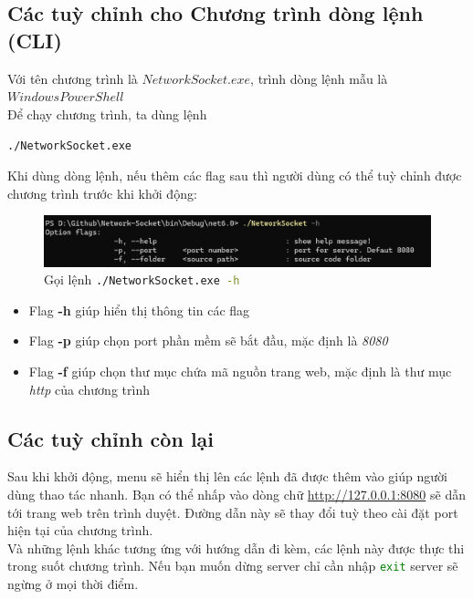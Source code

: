 \documentclass[14pt, a4paper]{extarticle}
\newcommand{\shell}[1]{\lstinline[language=bash, basicstyle=\color{orange!40!black}\large\ttfamily,
keywordstyle=\color{blue},
commentstyle=\color{green!50!black},]{#1}}
\begin{document}
\subsection{Các tuỳ chỉnh cho Chương trình dòng lệnh (CLI)}

Với tên chương trình là $NetworkSocket.exe$, trình dòng lệnh mẫu là $Windows PowerShell$\\

Để chạy chương trình, ta dùng lệnh\\
\begin{center}
    \shell{./NetworkSocket.exe}
\end{center}
Khi dùng dòng lệnh, nếu thêm các flag sau thì người dùng có thể tuỳ chỉnh được chương trình trước khi khởi động:
\begin{figure}[!h]
    \begin{center}
        \includegraphics{PicGuide/Help.png}
        \caption{Gọi lệnh \shell{./NetworkSocket.exe -h}}
    \end{center}
\end{figure}
\begin{itemize}
    \item Flag \textbf{-h} giúp hiển thị thông tin các flag
    \item Flag \textbf{-p} giúp chọn port phần mềm sẽ bắt đầu, mặc định là \textit{8080}
    \item Flag \textbf{-f} giúp chọn thư mục chứa mã nguồn trang web, mặc định là thư mục \textit{http} của chương trình
\end{itemize}
\subsection{Các tuỳ chỉnh còn lại}

Sau khi khởi động, menu sẽ hiển thị lên các lệnh đã được thêm vào giúp người dùng thao tác nhanh.
Bạn có thể nhấp vào dòng chữ \href{http://127.0.0.1:8080}{http://127.0.0.1:8080} sẽ dẫn tới trang web trên trình duyệt. Đường dẫn này sẽ thay đổi tuỳ theo cài đặt port hiện tại của chương trình.\\

Và những lệnh khác tương ứng với hướng dẫn đi kèm, các lệnh này được thực thi trong suốt chương trình. Nếu bạn muốn dừng server chỉ cần nhập \shell{exit} server sẽ ngừng ở mọi thời điểm.\\
\end{document}
